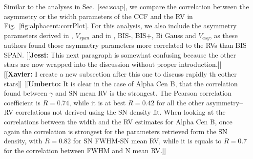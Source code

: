 \documentclass{aa}
\newcommand{\jessi}[1]{{\color{Purple}[[\textbf{Jessi: }#1]]}}
\newcommand{\xavier}[1]{{\color{blue}[[\textbf{Xavier: }#1]]}}
\newcommand{\umberto}[1]{{\color{green}[[\textbf{Umberto: }#1]]}}
\begin{document}
Similar to the analyses in Sec.~\ref{sec:soap}, we compare the correlation between the asymmetry or the width parameters of the CCF and the RV in Fig.~\ref{fig:alphacent:corrPlot}. 
For this analysis, we also include the asymmetry parameters derived in \citet{Boisse-2011}, $V_{span}$ and in \citet{Figueira-2013}, BIS-, BIS+, Bi Gauss and $V_{asy}$, as these authors found those asymmetry parameters more correlated to the RVs than BIS SPAN. 
\jessi{This next paragraph is somewhat confusing because the other stars are now wrapped into the discussion without proper introduction.}
\xavier{I create a new subsection after this one to discuss rapidly th eother stars}
\umberto{It is clear in the case of Alpha Cen B, that the correlation found between $\gamma$ and SN mean RV is the strongest. 
The Pearson correlation coefficient is $R=0.74$, while it is at best $R=0.42$ for all the other asymmetry--RV correlations not derived using the SN density fit.
When looking at the correlations between the width and the RV estimates for Alpha Cen B, once again the correlation is strongest for the parameters retrieved form the SN density, with $R=0.82$ for SN FWHM-SN mean RV, while it is equals to $R=0.7$ for the correlation between FWHM and N mean RV.}
%
%
\end{document}
